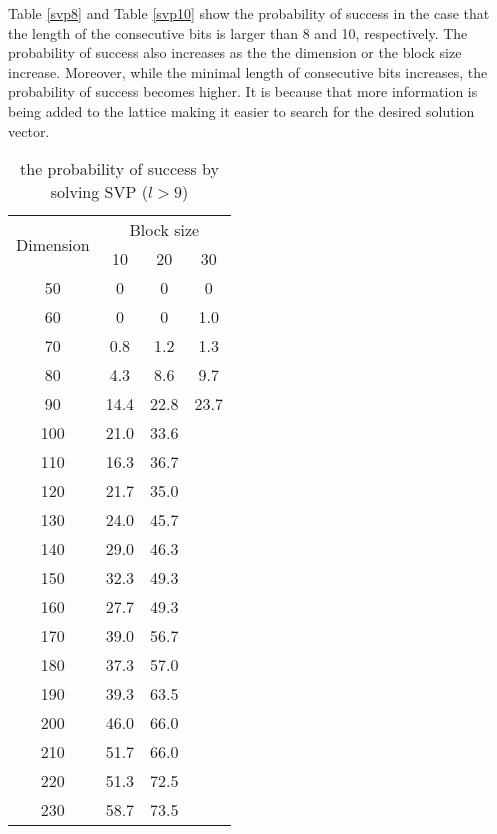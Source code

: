 Table \ref{svp8} and Table \ref{svp10} show the probability of success in the case that the length of the consecutive bits is larger than 8 and 10, respectively.
The probability of success also increases as the the dimension or the block size increase.
Moreover, while the minimal length of consecutive bits increases, the probability of success becomes higher.
It is because that more information is being added to the lattice making it easier to search for the desired solution vector. 

\begin{table}[b]
  \centering
  \caption{the probability of success by solving SVP ($l > 9$)}
  \label{svp9}
    \begin{tabular}{|c|c|c|c|}
    \hline
    \multirow{2}{*}{Dimension}&
    \multicolumn{3}{c|}{Block size} \\%
    \cline{2-4}
    & 10 & 20 & 30\\
  \hline
  50 & 0 & 0 & 0 \\
  \hline
  60 & 0 & 0 & 1.0 \\
  \hline
  70 & 0.8 & 1.2  & 1.3 \\
  \hline
  80 & 4.3 & 8.6 &  9.7 \\
  \hline
  90 & 14.4 & 22.8 & 23.7 \\
  \hline
  100 & 21.0 & 33.6 &  \\
  \hline
  110 & 16.3 & 36.7 &  \\
  \hline
  120 & 21.7 & 35.0 &  \\
  \hline
  130 & 24.0 & 45.7 &  \\
  \hline
  140 & 29.0 & 46.3 &  \\
  \hline
  150 & 32.3 & 49.3 &  \\
  \hline
  160 & 27.7 & 49.3 &  \\
  \hline
  170 & 39.0 & 56.7 &  \\
  \hline
  180 & 37.3 & 57.0 &  \\
  \hline
  190 & 39.3 & 63.5 &  \\
  \hline
  200 & 46.0 & 66.0 &  \\
  \hline
  210 & 51.7 & 66.0 &  \\
  \hline
  220 & 51.3 & 72.5 &  \\
  \hline
  230 & 58.7 & 73.5 &  \\
  \hline
    \end{tabular}
\end{table}

